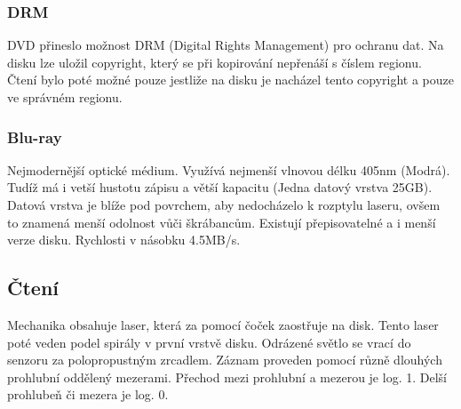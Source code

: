 \subsubsection{DRM}
DVD přineslo možnost DRM (Digital Rights Management) pro ochranu dat.
Na disku lze uložil copyright, který se při kopirování nepřenáší s číslem regionu.
Čtení bylo poté možné pouze jestliže na disku je nacházel tento copyright a pouze ve správném regionu.
\subsubsection{Blu-ray}
Nejmodernější optické médium.
Využívá nejmenší vlnovou délku 405nm (Modrá).
Tudíž má i vetší hustotu zápisu a větší kapacitu (Jedna datový vrstva 25GB).
Datová vrstva je blíže pod povrchem, aby nedocházelo k rozptylu laseru, ovšem to znamená menší odolnost vůči škrábancům.
Existují přepisovatelné a i menší verze disku.
Rychlosti v násobku 4.5MB/s.
\subsection{Čtení}
Mechanika obsahuje laser, která za pomocí čoček zaostřuje na disk.
Tento laser poté veden podel spirály v první vrstvě disku.
Odrázené světlo se vrací do senzoru za polopropustným zrcadlem.
Záznam proveden pomocí různě dlouhých prohlubní oddělený mezerami.
Přechod mezi prohlubní a mezerou je log. 1.
Delší prohlubeň či mezera je log. 0.
